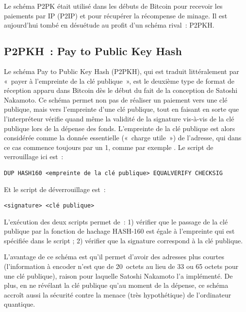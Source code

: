 Le schéma P2PK était utilisé dans les débuts de Bitcoin pour recevoir les paiements par IP (P2IP) et pour récupérer la récompense de minage. Il est aujourd'hui tombé en désuétude au profit d'un schéma rival~: P2PKH.


\subsection{P2PKH~: Pay to Public Key Hash} Le schéma Pay to Public Key Hash (P2PKH), qui est traduit littéralement par «~payer à l'empreinte de la clé publique~», est le deuxième type de format de réception apparu dans Bitcoin dès le début du fait de la conception de Satoshi Nakamoto. Ce schéma permet non pas de réaliser un paiement vers une clé publique, mais vers l'empreinte d'une clé publique, tout en faisant en sorte que l'interpréteur vérifie quand même la validité de la signature vis-à-vis de la clé publique lors de la dépense des fonds. L'empreinte de la clé publique est alors considérée comme la donnée essentielle («~charge utile~») de l'adresse, qui dans ce cas commence toujours par un 1, comme par exemple . Le script de verrouillage ici est~:

\begin{Verbatim}[fontsize=\footnotesize]
DUP HASH160 <empreinte de la clé publique> EQUALVERIFY CHECKSIG
\end{Verbatim}

Et le script de déverrouillage est~:

\begin{Verbatim}[fontsize=\footnotesize]
<signature> <clé publique>
\end{Verbatim}

L'exécution des deux scripts permet de~: 1) vérifier que le passage de la clé publique par la fonction de hachage HASH-160 est égale à l'empreinte qui est spécifiée dans le script ; 2) vérifier que la signature correspond à la clé publique.

L'avantage de ce schéma est qu'il permet d'avoir des adresses plus courtes (l'information à encoder n'est que de 20~octets au lieu de 33 ou 65 octets pour une clé publique), raison pour laquelle Satoshi Nakamoto l'a implémenté. De plus, en ne révélant la clé publique qu'au moment de la dépense, ce schéma accroît aussi la sécurité contre la menace (très hypothétique) de l'ordinateur quantique.


